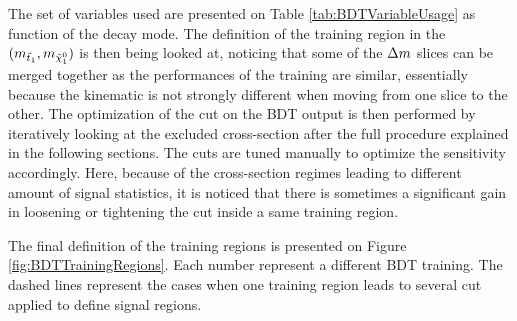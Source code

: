             The set of variables used are presented on Table \ref{tab:BDTVariableUsage} as function of the decay mode. The definition
            of the training region in the $(m_{\tilde{t}_1},m_{\tilde{\chi}_1^0})$ is then being looked at, noticing that some of the
            $\Delta m$ slices can be merged together as the performances of the training are similar, essentially because the kinematic
            is not strongly different when moving from one slice to the other. The optimization of the cut on the BDT output is then
            performed by iteratively looking at the excluded cross-section after the full procedure explained in the following sections.
            The cuts are tuned manually to optimize the sensitivity accordingly. Here, because of the cross-section regimes leading to 
            different amount of signal statistics, it is noticed that there is sometimes a significant gain in loosening or tightening
            the cut inside a same training region.

            The final definition of the training regions is presented on Figure \ref{fig:BDTTrainingRegions}. Each number represent a 
            different BDT training. The dashed lines represent the cases when one training region leads to several cut applied to define
            signal regions.

                        

